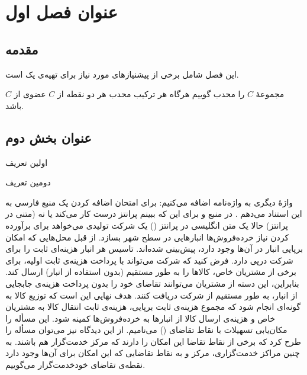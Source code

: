 \chapter{عنوان فصل اول }
\section{مقدمه}
این فصل
 شامل برخی از پیشنیازهای  مورد نیاز برای تهیه‌ی یک   است.
\begin{definition}
مجموعهٔ $C$ را محدب گوییم هرگاه هر ترکیب محدب هر دو نقطه از $C$ عضوی از $C$ باشد.
\end{definition}
\section{عنوان بخش دوم}

\begin{definition}
اولین تعریف
\end{definition}


\begin{definition}
دومین تعریف
\end{definition}


واژهٔ دیگری به واژه‌نامه اضافه می‌کنیم: 
برای امتحان اضافه کردن یک منبع فارسی به این استناد می‌دهم \cite{irscholar494611}. در منبع   \cite{glasner2007enveloping} و \cite{diestel2012sequences} برای این که ببینم پرانتز درست کار می‌کند یا نه (متنی در پرانتز) حالا یک متن انگلیسی در پرانتز ()
یک شرکت   تولیدی می‌خواهد برای برآورده کردن نیاز خرده‌فروش‌ها انبارهایی در سطح شهر بسازد. از قبل محل‌هایی که امکان برپایی انبار در آن‌ها وجود دارد، پیش‌بینی شده‌اند. تاسیس هر انبار هزینه‌‌ای ثابت را برای شرکت درپی دارد. فرض کنید که شرکت می‌تواند با پرداخت هزینه‌ی ثابت اولیه، برای برخی از مشتریان خاص، کالاها را به طور مستقیم (بدون استفاده از انبار) ارسال کند. بنابراین، این دسته از مشتریان می‌توانند تقاضای خود را  بدون  پرداخت هزینه‌ی جابجایی از انبار، به طور مستقیم از شرکت دریافت کنند. هدف نهایی این است که توزیع کالا به گونه‌ای انجام شود که مجموع هزینه‌ی ثابت برپایی، هزینه‌ی ثابت انتقال کالا به مشتریان خاص و هزینه‌ی ارسال کالا از انبارها به خرده‌فروش‌ها کمینه شود.  این مسأله را مکان‌یابی تسهیلات با نقاط تقاضای    () می‌نامیم. از این دیدگاه نیز می‌توان مسأله را طرح کرد که برخی از نقاط تقاضا این امکان را دارند که مرکز خدمت‌گزار هم باشند. به چنین مراکز خدمت‌گزاری، مرکز   و به نقاط تقاضایی که این امکان برای آن‌ها وجود دارد  نقطه‌ی تقاضای خودخدمت‌گزار  می‌گوییم. 

